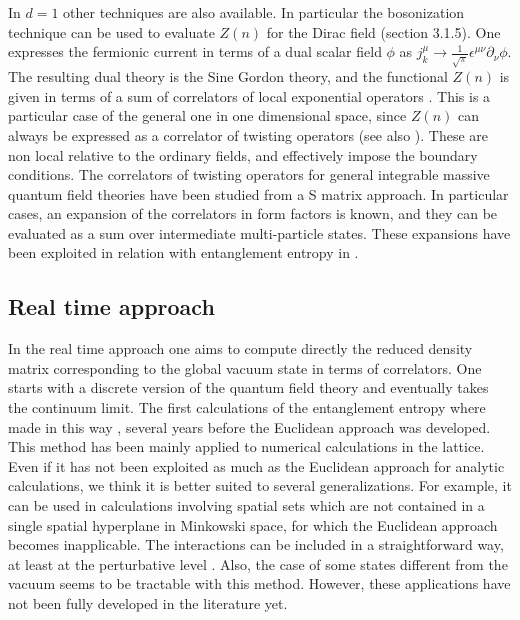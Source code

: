 \documentclass[a4paper]{article}
\begin{document}
In $d=1$ other techniques are also available. In particular the bosonization technique can be used to evaluate $Z(n)$ for the Dirac field (section 3.1.5). One expresses the fermionic current in terms of a dual scalar field $\phi$ as $j_{k}^{\mu }\to \frac{1}{\sqrt{\pi }}\epsilon ^{\mu \nu }\partial_{\nu}\phi$.
The resulting dual theory is the Sine Gordon theory, and the functional $Z(n)$ is given in terms of a sum of  correlators of local exponential operators \cite{fermion}. 
This is a particular case of the general one in one dimensional space, since $Z(n)$ can always be expressed as a correlator of twisting operators \cite{ccd} (see also \cite{cg}). These are non local relative to the ordinary fields, and effectively impose the boundary conditions. The correlators of twisting operators for general integrable massive quantum field theories have been studied  from a S matrix approach. In particular cases, an expansion of the correlators in form factors is known, and they can be evaluated as a sum over intermediate multi-particle states. These expansions have been exploited in relation with entanglement entropy in \cite{dc,ccd,d1}.




\subsection{Real time approach}
 In the real time approach one aims to compute directly the reduced density matrix corresponding to the global vacuum state in terms of correlators. One starts with a discrete version of the quantum field theory and eventually takes the continuum limit. 
The first calculations of the entanglement entropy where made in this way \cite{bombelli}, several years before the Euclidean approach was developed. This method has been mainly applied to numerical calculations in the lattice. Even if it has not been exploited as much as the Euclidean approach for analytic calculations, we think it is better suited to several generalizations. For example, it can be used in  calculations involving spatial sets which are not contained in a single spatial hyperplane in Minkowski space, for which the Euclidean approach becomes inapplicable. The interactions can be included in a straightforward way, at least at the perturbative level \cite{v1}. Also, the case of some states different from the vacuum seems to be tractable with this method. However, these applications have not been fully developed in the literature yet.
 
\end{document}
